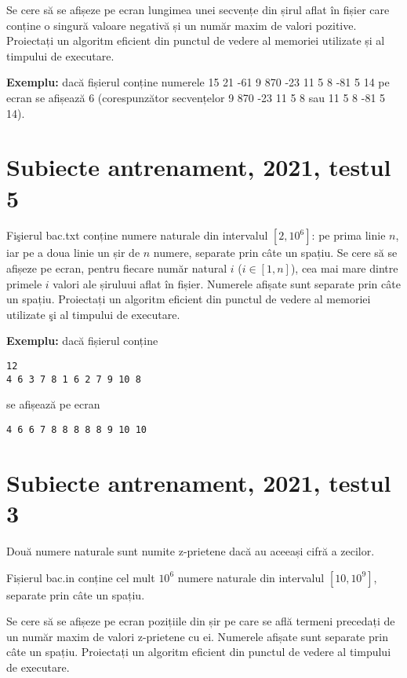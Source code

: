 \documentclass[10pt, a4paper]{article}
\newcommand{\highlight}[1]{{\ttfamily\color{red}#1}}
\begin{document}
\vspace{0.2cm}
\noindent Se cere să se afișeze pe ecran lungimea unei secvențe din șirul aflat în fișier care conține o singură valoare negativă și un număr maxim de valori pozitive. Proiectați un algoritm eficient din punctul de vedere al memoriei utilizate și al timpului de executare.

\vspace{0.2cm}
\noindent \textbf{Exemplu:} dacă fișierul conține numerele \highlight{15 21 -61 9 870 -23 11 5 8 -81 5 14} pe ecran se afișează \highlight{$6$} (corespunzător secvențelor \highlight{9 870 -23 11 5 8} sau \highlight{11 5 8 -81 5 14}).

\section{Subiecte antrenament, 2021, testul 5}
Fişierul \highlight{bac.txt} conține numere naturale din intervalul \highlight{$[2,10^6]$}: pe prima linie \highlight{$n$}, iar pe a doua linie un șir de \highlight{$n$} numere, separate prin câte un spațiu. Se cere să se afișeze pe ecran, pentru fiecare număr natural \highlight{$i$} (\highlight{$i \in [1,n]$}), cea mai mare dintre primele \highlight{$i$} valori ale șiruluui aflat în fișier. Numerele afișate sunt separate prin câte un spațiu. Proiectați un algoritm eficient din punctul de vedere al memoriei utilizate şi al timpului de executare.

\vspace{0.2cm}
\noindent \textbf{Exemplu:} dacă fișierul conține 
\begin{verbatim}
12
4 6 3 7 8 1 6 2 7 9 10 8
\end{verbatim}
se afișează pe ecran
\begin{verbatim}
4 6 6 7 8 8 8 8 8 9 10 10
\end{verbatim}

\section{Subiecte antrenament, 2021, testul 3}
Două numere naturale sunt numite \highlight{z-prietene} dacă au aceeași cifră a zecilor.

\vspace{0.2cm}
\noindent Fișierul \highlight{bac.in} conține cel mult \highlight{$10^6$} numere naturale din intervalul \highlight{$[10,10^9]$}, separate prin câte un spațiu.

\vspace{0.2cm}
\noindent Se cere să se afișeze pe ecran pozițiile din șir pe care se află termeni precedați de un număr maxim de valori z-prietene cu ei. Numerele afișate sunt separate prin câte un spațiu. Proiectați un algoritm eficient din punctul de vedere al timpului de executare.
\end{document}
